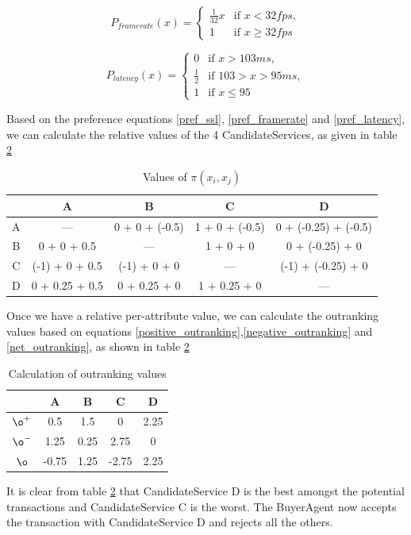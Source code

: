 \documentclass[10pt,journal,compsoc]{IEEEtran}
\begin{document}
	\begin{equation}
		P_{framerate}(x) = \begin{cases} \frac{1}{32}x &\mbox{if } x < 32fps,\\ 
										1 &\mbox{if } x \geq 32fps \end{cases}
			\label{pref_framerate}										
	\end{equation}
	
	\begin{equation}
		P_{latency}(x) = \begin{cases} 0 &\mbox{if } x > 103ms,\\ 
									   \frac{1}{2}	 &\mbox{if } 103 > x > 95ms, \\
										1 &\mbox{if } x \leq 95 \end{cases}
			\label{pref_latency}
	\end{equation}
	
Based on the preference equations \ref{pref_ssl}, \ref{pref_framerate} and \ref{pref_latency}, we can calculate the relative values of the 4 CandidateServices, as given in table \ref{tbl:outranking_table}
	\begin{table}[htbp]
		\centering
		\caption{Values of $\pi(x_i, x_j)$ \label{tbl_ranking_values}}
		\begin{tabular}{c|cccc}
		\toprule
		  & A & B & C & D \\
		\midrule
		A & --- & 0 + 0 + (-0.5) & 1 + 0 + (-0.5) & 0 + (-0.25) + (-0.5) \\
		B & 0 + 0 + 0.5 & --- & 1 + 0 + 0 & 0 + (-0.25) + 0 \\
		C & (-1) + 0 + 0.5 & (-1) + 0 + 0 & --- & (-1) + (-0.25) + 0 \\
		D & 0 + 0.25 + 0.5 & 0 + 0.25 + 0 & 1 + 0.25 + 0 & --- \\
		\bottomrule
		\end{tabular}
	\end{table}
Once we have a relative per-attribute value, we can calculate the outranking values based on equations \ref{positive_outranking},\ref{negative_outranking} and \ref{net_outranking}, as shown in table \ref{tbl:outranking_table}

	\begin{table}[htbp]
		\centering
		\renewcommand{\arraystretch}{1.5}
		\begin{tabular}{c|cccc}
		\toprule
		   			& A & B & C & D \\
		\midrule
			$\o^{+}$	& 0.5 & 1.5 & 0 & 2.25 \\
			$\o^{-}$	& 1.25 & 0.25 & 2.75 & 0 \\
			\hline
			$\o$		& -0.75 & 1.25 & -2.75 & 2.25 \\
		\bottomrule
		\end{tabular}			
		\caption{Calculation of outranking values \label{tbl:outranking_table}}
	\end{table}
It is clear from table \ref{tbl:outranking_table} that CandidateService D is the best amongst the potential transactions and CandidateService C is the worst. The BuyerAgent now accepts the transaction with CandidateService D and rejects all the others. 
\end{document}

